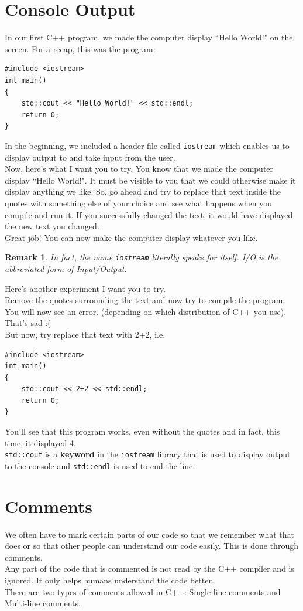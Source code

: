 \documentclass[letterpaper, 12pt]{book}
\newtheorem{remark}{Remark}
\begin{document}
\section{Console Output}
In our first C++ program, we made the computer display ``Hello World!" on the screen. For a recap, this was the program:
\begin{lstlisting}
#include <iostream>
int main()
{
	std::cout << "Hello World!" << std::endl;
	return 0;
}
\end{lstlisting}
In the beginning, we included a header file called \lstinline{iostream} which enables us to display output to and take input from the user.\\
Now, here's what I want you to try. You know that we made the computer display ``Hello World!". It must be visible to you that we could otherwise make it display anything we like. So, go ahead and try to replace that text inside the quotes with something else of your choice and see what happens when you compile and run it. If you successfully changed the text, it would have displayed the new text you changed.\\
Great job! You can now make the computer display whatever you like.\\
\begin{remark}
In fact, the name \lstinline{iostream} literally speaks for itself. I/O is the abbreviated form of Input/Output.
\end{remark}
Here's another experiment I want you to try.\\
Remove the quotes surrounding the text and now try to compile the program.\\
You will now see an error. (depending on which distribution of C++ you use). That's sad :(\\
But now, try replace that text with 2+2, i.e.\\
\begin{lstlisting}
#include <iostream>
int main()
{
	std::cout << 2+2 << std::endl;
	return 0;
}
\end{lstlisting}
You'll see that this program works, even without the quotes and in fact, this time, it displayed 4.\\
\lstinline{std::cout} is a \textbf{keyword} in the \lstinline{iostream} library that is used to display output to the console and \lstinline{std::endl} is used to end the line.
\section{Comments}
We often have to mark certain parts of our code so that we remember what that does or so that other people can understand our code easily. This is done through comments.\\
Any part of the code that is commented is not read by the C++ compiler and is ignored. It only helps humans understand the code better.\\
There are two types of comments allowed in C++: Single-line comments and Multi-line comments.
\end{document}
